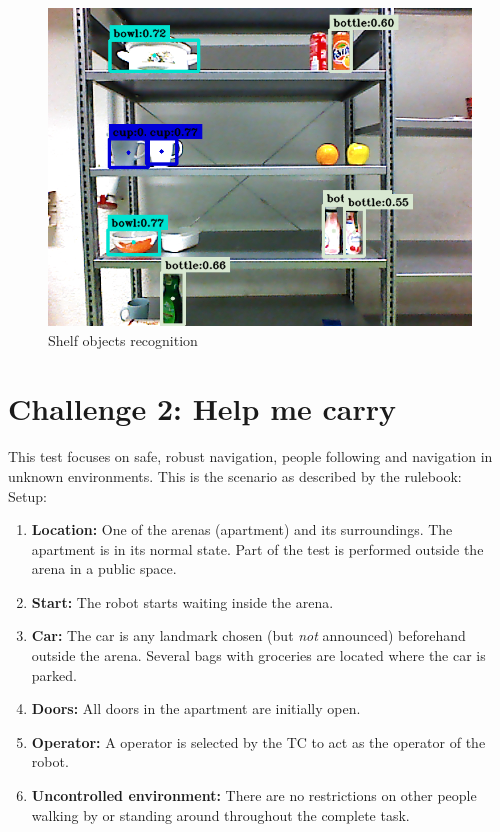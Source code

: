 \documentclass[a4paper, twocolumn]{article}
\begin{document}
    \begin{figure}
        \includegraphics[width=\columnwidth]{../img/yolo_shelf.png}
        \caption{Shelf objects recognition}
        \label{shelf_recog}
    \end{figure}

    \section{Challenge 2: Help me carry}

    This test focuses on safe, robust navigation, people following and navigation in unknown environments. This is the scenario as described by the rulebook:\\

    Setup:
    \begin{enumerate}
      \item \textbf{Location:} One of the arenas (apartment) and its surroundings. The apartment is in its normal state. Part of the test is performed outside the arena in a public space.
      \item \textbf{Start:} The robot starts waiting inside the arena.
      \item \textbf{Car:} The car is any landmark chosen (but \emph{not} announced) beforehand outside the arena. Several bags with groceries are located where the car is parked.
      \item \textbf{Doors:} All doors in the apartment are initially open.
      \item \textbf{Operator:} A  operator is selected by the TC to act as the operator of the robot.
      \item \textbf{Uncontrolled environment:} There are no restrictions on other people walking by or standing around throughout the complete task.
    \end{enumerate}
\end{document}
